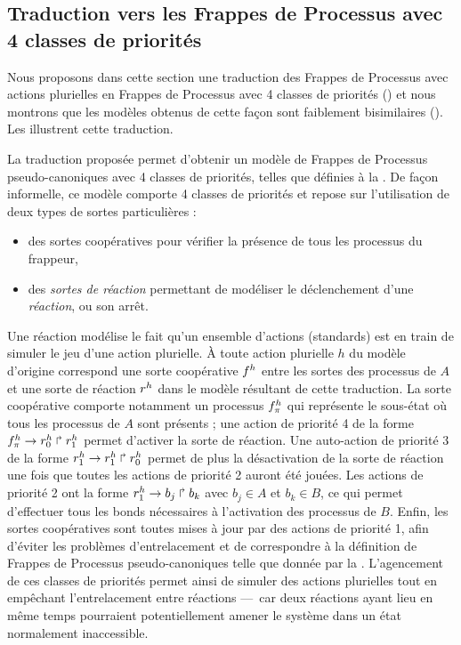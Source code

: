\subsection{Traduction vers les Frappes de Processus avec 4 classes de priorités}

Nous proposons dans cette section une traduction des Frappes de Processus
avec actions plurielles en Frappes de Processus avec 4 classes de priorités ()
et nous montrons que les modèles obtenus de cette façon sont faiblement bisimilaires
().
Les  illustrent cette traduction.

La traduction proposée permet d'obtenir un modèle de
Frappes de Processus pseudo-canoniques avec 4 classes de priorités,
telles que définies à la .
De façon informelle, ce modèle comporte 4 classes de priorités
et repose sur l'utilisation de deux types de sortes particulières :
\begin{itemize}
  \item des sortes coopératives pour vérifier la présence de tous les processus du frappeur,
  \item des \emph{sortes de réaction} permettant de modéliser le déclenchement d'une \emph{réaction},
    ou son arrêt.
\end{itemize}
Une réaction modélise le fait qu'un ensemble d'actions (standards) est en train
de simuler le jeu d'une action plurielle.
À toute action plurielle $h$ du modèle d'origine correspond une sorte coopérative $f^{h}$
entre les sortes des processus de $A$
et une sorte de réaction $r^{h}$ dans le modèle résultant de cette traduction.
La sorte coopérative comporte notamment un processus $f^{h}_\pi$ qui représente le sous-état
où tous les processus de $A$ sont présents ; une action de priorité 4 de la forme
$f^{h}_\pi\rightarrow r^{h}_0\Rsh r^{h}_1$ permet d'activer la sorte de réaction.
Une auto-action de priorité 3 de la forme $r^{h}_1\rightarrow r^{h}_1\Rsh r^{h}_0$
permet de plus la désactivation de la sorte de réaction
une fois que toutes les actions de priorité 2 auront été jouées.
Les actions de priorité 2 ont la forme $r^{h}_1\rightarrow b_j\Rsh b_k$
avec $b_j \in A$ et $b_k \in B$,
ce qui permet d'effectuer tous les bonds nécessaires à l'activation des processus de $B$.
Enfin, les sortes coopératives sont toutes mises à jour par des actions de priorité 1,
afin d'éviter les problèmes d'entrelacement
et de correspondre à la définition de Frappes de Processus pseudo-canoniques
telle que donnée par la .
L'agencement de ces classes de priorités permet ainsi de simuler des actions plurielles
tout en empêchant l'entrelacement entre réactions
---~car deux réactions ayant lieu en même temps pourraient potentiellement
amener le système dans un état normalement inaccessible.

